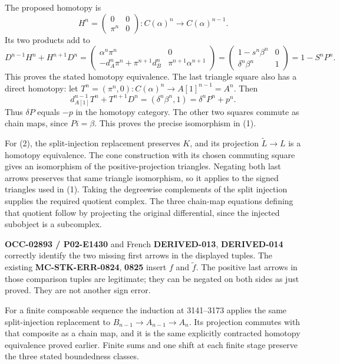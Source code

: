 \documentclass[11pt]{article}
\begin{document}
The proposed homotopy is \[
H^n=\begin{pmatrix}0&0\\\pi^n&0\end{pmatrix}:
C(\alpha)^n\longrightarrow C(\alpha)^{n-1}.
\] Its two products add to \[
D^{n-1}H^n+H^{n+1}D^n
=\begin{pmatrix}
\alpha^n\pi^n&0\\
-d_A^n\pi^n+\pi^{n+1}d_B^n&\pi^{n+1}\alpha^{n+1}
\end{pmatrix}
=\begin{pmatrix}1-s^n\beta^n&0\\\delta^n\beta^n&1\end{pmatrix}
=1-S^nP^n.
\] This proves the stated homotopy equivalence. The last triangle square also has a direct homotopy:\allowbreak{} let \(T^n=(\pi^n,0):C(\alpha)^n\to A[1]^{n-1}=A^n\). Then \[
d_{A[1]}^{n-1}T^n+T^{n+1}D^n
=(\delta^n\beta^n,1)=\delta^nP^n+p^n.
\] Thus \(\delta P\) equals \(-p\) in the homotopy category. The other two squares commute as chain maps,\allowbreak{} since \(Pi=\beta\). This proves the precise isomorphism in (1)\allowbreak{}.

For (2)\allowbreak{},\allowbreak{} the split-injection replacement preserves \(K\),\allowbreak{} and its projection \(\widetilde L\to L\) is a homotopy equivalence. The cone construction with its chosen commuting square gives an isomorphism of the positive-projection triangles. Negating both last arrows preserves that same triangle isomorphism,\allowbreak{} so it applies to the signed triangles used in (1)\allowbreak{}. Taking the degreewise complements of the split injection supplies the required quotient complex. The three chain-map equations defining that quotient follow by projecting the original differential,\allowbreak{} since the injected subobject is a subcomplex.

\textbf{OCC-02893 /\allowbreak{} P02-E1430} and French \textbf{DERIVED-013},\allowbreak{} \textbf{DERIVED-014} correctly identify the two missing first arrows in the displayed tuples. The existing \textbf{MC-STK-ERR-0824},\allowbreak{} \textbf{0825} insert \(f\) and \(\widetilde f\). The positive last arrows in those comparison tuples are legitimate; they can be negated on both sides as just proved. They are not another sign error.

For a finite composable sequence the induction at 3141–\allowbreak{}3173 applies the same split-injection replacement to \(B_{n-1}\to A_{n-1}\to A_n\). Its projection commutes with that composite as a chain map,\allowbreak{} and it is the same explicitly contracted homotopy equivalence proved earlier. Finite sums and one shift at each finite stage preserve the three stated boundedness classes.
\end{document}
